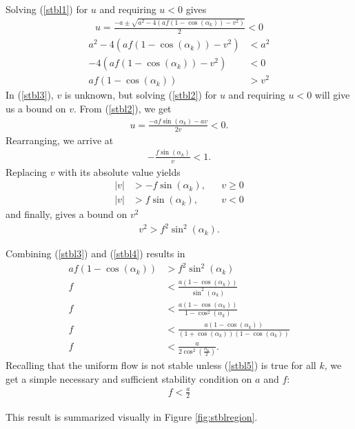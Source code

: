\documentclass[10pt,twocolumn]{article}
\begin{document}
Solving (\ref{stbl1}) for $u$ and requiring $u<0$ gives
\begin{gather}
u = \frac{-a \pm \sqrt{a^2 - 4(af(1-\cos(\alpha_k))-v^2)}}{2} < 0
\end{gather}
\begin{align}
 a^2 - 4(af(1-\cos(\alpha_k))-v^2) &< a^2\\
 - 4(af(1-\cos(\alpha_k))-v^2) &< 0\\
\label{stbl3}  af(1-\cos(\alpha_k)) &> v^2
\end{align}
In (\ref{stbl3}), $v$ is unknown, but solving (\ref{stbl2}) for $u$ and requiring $u<0$ will give us a bound on $v$. From (\ref{stbl2}), we get
\begin{gather}
u = \frac{-af\sin(\alpha_k)-av}{2v} < 0.
\end{gather}
Rearranging, we arrive at
\begin{gather}
-\frac{f\sin(\alpha_k)}{v} < 1.
\end{gather}
Replacing $v$ with its absolute value yields
\begin{align}
|v|&>-f\sin(\alpha_k),& &v \geq 0\\
|v|&>f\sin(\alpha_k),& &v<0
\end{align}
and finally, gives a bound on $v^2$
\begin{gather}
\label{stbl4} v^2 > f^2\sin^2(\alpha_k).
\end{gather}

Combining (\ref{stbl3}) and (\ref{stbl4}) results in
\begin{align}
af(1-\cos(\alpha_k)) &> f^2\sin^2(\alpha_k)\\
 f &< \frac{a(1-\cos(\alpha_k))}{\sin^2(\alpha_k)}\\
 f &< \frac{a(1-\cos(\alpha_k))}{1-\cos^2(\alpha_k)}\\
 f &< \frac{a(1-\cos(\alpha_k))}{(1+\cos(\alpha_k))(1-\cos(\alpha_k))}\\
\label{stbl5}  f &< \frac{a}{2\cos^2(\frac{\alpha_k}{2})}.
\end{align}
Recalling that the uniform flow is not stable unless (\ref{stbl5}) is true for all $k$, we get a simple necessary and sufficient stability condition on $a$ and $f$:
\begin{gather}
f < \frac{a}{2}
\end{gather}

This result is summarized visually in Figure \ref{fig:stblregion}.
\end{document}
